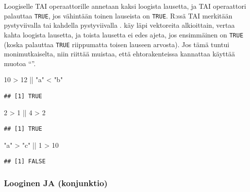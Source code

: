\documentclass[
]{book}
\newenvironment{Shaded}{\begin{snugshade}}{\end{snugshade}}
\newcommand{\DecValTok}[1]{\textcolor[rgb]{0.00,0.00,0.81}{#1}}
\newcommand{\SpecialCharTok}[1]{\textcolor[rgb]{0.00,0.00,0.00}{#1}}
\newcommand{\StringTok}[1]{\textcolor[rgb]{0.31,0.60,0.02}{#1}}
\begin{document}
Loogiselle TAI operaattorille annetaan kaksi loogista lausetta, ja TAI operaattori palauttaa \texttt{TRUE}, jos vähintään toinen lauseista on \texttt{TRUE}. R:ssä TAI merkitään pystyviivalla \texttt{\textbar{}} tai kahdella pystyviivalla \texttt{\textbar{}\textbar{}}. \texttt{\textbar{}} käy läpi vektoreita alkioittain, \texttt{\textbar{}\textbar{}} vertaa kahta loogista lausetta, ja toista lausetta ei edes ajeta, jos ensimmäinen on \texttt{TRUE} (koska \texttt{\textbar{}\textbar{}} palauttaa \texttt{TRUE} riippumatta toisen lauseen arvosta). Jos tämä tuntui monimutkaiselta, niin riittää muistaa, että ehtorakenteissa kannattaa käyttää muotoa ``\textbar\textbar{}''.

\begin{Shaded}
\begin{Highlighting}[]
\DecValTok{10} \SpecialCharTok{\textgreater{}} \DecValTok{12} \SpecialCharTok{||} \StringTok{"a"} \SpecialCharTok{\textless{}} \StringTok{"b"}
\end{Highlighting}
\end{Shaded}

\begin{verbatim}
## [1] TRUE
\end{verbatim}

\begin{Shaded}
\begin{Highlighting}[]
\DecValTok{2} \SpecialCharTok{\textgreater{}} \DecValTok{1} \SpecialCharTok{||} \DecValTok{4} \SpecialCharTok{\textgreater{}} \DecValTok{2}
\end{Highlighting}
\end{Shaded}

\begin{verbatim}
## [1] TRUE
\end{verbatim}

\begin{Shaded}
\begin{Highlighting}[]
\StringTok{"a"} \SpecialCharTok{\textgreater{}} \StringTok{"c"} \SpecialCharTok{||} \DecValTok{1} \SpecialCharTok{\textgreater{}} \DecValTok{10}
\end{Highlighting}
\end{Shaded}

\begin{verbatim}
## [1] FALSE
\end{verbatim}

\hypertarget{looginen-ja-konjunktio}{%
\subsubsection{Looginen JA (konjunktio)}\label{looginen-ja-konjunktio}}
\end{document}
